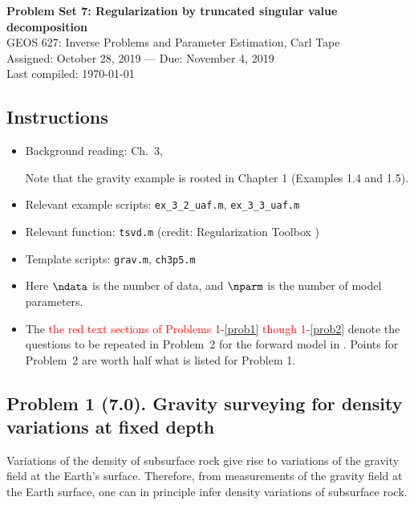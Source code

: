 \documentclass[11pt,titlepage,fleqn]{article}
\begin{document}

\begin{spacing}{1.2}
\centering
{\large \bf Problem Set 7: Regularization by truncated singular value decomposition} \\
GEOS 627: Inverse Problems and Parameter Estimation, Carl Tape \\
Assigned: October 28, 2019 --- Due: November 4, 2019 \\
Last compiled: \today
\end{spacing}


\subsection*{Instructions}

\begin{itemize}
\item Background reading: Ch.~3, \citet{AsterE2}

Note that the gravity example is rooted in Chapter 1 (Examples 1.4 and 1.5).

\item Relevant example scripts: \verb+ex_3_2_uaf.m+, \verb+ex_3_3_uaf.m+
\item Relevant function: \verb+tsvd.m+ (credit: Regularization Toolbox \citep{Hansen})
\item Template scripts: \verb+grav.m+, \verb+ch3p5.m+
\item Here $\ndata$ is the number of data, and $\nparm$ is the number of model parameters.
\item The \textcolor{red}{the red text sections of Problems 1-\ref{prob1} though 1-\ref{prob2}} denote the questions to be repeated in Problem~2 for the forward model in . Points for Problem~2 are worth half what is listed for Problem 1.
\end{itemize}


\subsection*{Problem 1 (7.0). Gravity surveying for density variations at fixed depth}

Variations of the density of subsurface rock give rise to variations of the gravity field at the Earth's surface. Therefore, from measurements of the gravity field at the Earth surface, one can in principle infer density variations of subsurface rock.
\end{document}
